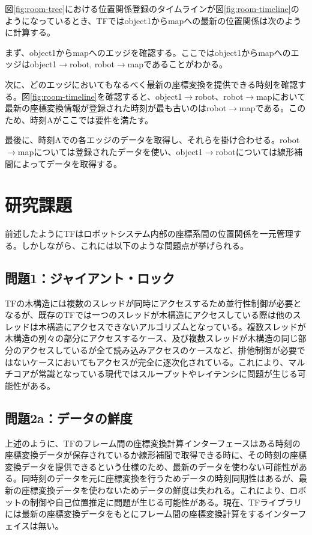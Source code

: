 \documentclass[a4paper]{jreport}	%
\begin{document}
図\ref{fig:room-tree}における位置関係登録のタイムラインが図\ref{fig:room-timeline}のようになっているとき、TFではobject1からmapへの最新の位置関係は次のように計算する。

まず、object1からmapへのエッジを確認する。ここではobject1からmapへのエッジはobject1$\rightarrow$robot, robot$\rightarrow$mapであることがわかる。

次に、どのエッジにおいてもなるべく最新の座標変換を提供できる時刻を確認する。図\ref{fig:room-timeline}を確認すると、object1$\rightarrow$robot、robot$\rightarrow$mapにおいて最新の座標変換情報が登録された時刻が最も古いのはrobot$\rightarrow$mapである。このため、時刻Aがここでは要件を満たす。

最後に、時刻Aでの各エッジのデータを取得し、それらを掛け合わせる。robot$\rightarrow$mapについては登録されたデータを使い、object1$\rightarrow$robotについては線形補間によってデータを取得する。

\section{研究課題}
前述したようにTFはロボットシステム内部の座標系間の位置関係を一元管理する。しかしながら、これには以下のような問題点が挙げられる。

\subsection*{問題1：ジャイアント・ロック}
TFの木構造には複数のスレッドが同時にアクセスするため並行性制御が必要となるが、既存のTFでは一つのスレッドが木構造にアクセスしている際は他のスレッドは木構造にアクセスできないアルゴリズムとなっている。複数スレッドが木構造の別々の部分にアクセスするケース、及び複数スレッドが木構造の同じ部分のアクセスしているが全て読み込みアクセスのケースなど、排他制御が必要ではないケースにおいてもアクセスが完全に逐次化されている。これにより、マルチコアが常識となっている現代ではスループットやレイテンシに問題が生じる可能性がある。

\subsection*{問題2a：データの鮮度}
上述のように、TFのフレーム間の座標変換計算インターフェースはある時刻の座標変換データが保存されているか線形補間で取得できる時に、その時刻の座標変換データを提供できるという仕様のため、最新のデータを使わない可能性がある。同時刻のデータを元に座標変換を行うためデータの時刻同期性はあるが、最新の座標変換データを使わないためデータの鮮度は失われる。これにより、ロボットの制御や自己位置推定に問題が生じる可能性がある。現在、TFライブラリには最新の座標変換データをもとにフレーム間の座標変換計算をするインターフェイスは無い。
\end{document}
